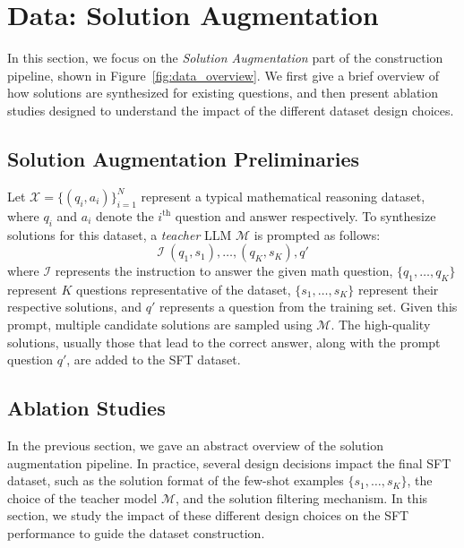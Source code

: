 
\section{Data: Solution Augmentation}
\label{sec:data-solution-augmentation}



In this section, we focus on the \emph{Solution Augmentation} part of the \dataset construction pipeline, shown in Figure~\ref{fig:data_overview}. 
We first give a brief overview of how solutions are synthesized for existing questions, and then present ablation studies designed to understand the impact of the different dataset design choices.  

\subsection{Solution Augmentation Preliminaries}
\label{sec:soln_augmentation}
Let $\mathcal{X} = \{\left(q_i, a_i\right)\}_{i=1}^N$ represent a 
typical mathematical reasoning dataset, where $q_i$ and $a_i$ denote the $i^\text{th}$ question and answer respectively. 
To synthesize solutions for this dataset, a \emph{teacher} LLM $\mathcal{M}$ is prompted as follows: 
$$\mathcal{I}\ \left(q_1, s_1\right), \dots, \left(q_K, s_K\right), q'$$ where $\mathcal{I}$ represents the instruction to answer the given math question, $\{q_1, \dots, q_K\}$ represent $K$ questions  representative of the dataset, $\{s_1, \dots, s_K\}$ represent their respective solutions, and $q'$ represents a question from the training set.
Given this prompt, multiple candidate solutions 
are sampled using $\mathcal{M}$. 
The high-quality solutions, usually those that lead to the correct answer, along with the prompt question $q'$, are added to the SFT dataset.





\subsection{Ablation Studies}
In the previous section, we gave an abstract overview of the solution augmentation pipeline. 
In practice, several design decisions impact the final SFT dataset, such as the solution format of the few-shot examples $\{s_1, \dots, s_K\}$, the choice of the teacher model $\mathcal{M}$, and the solution filtering mechanism. 
In this section, we study the impact of these different design choices on the SFT performance to guide the dataset construction. 

